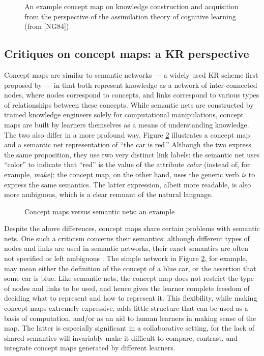 \begin{figure}
  \caption{An example concept map on knowledge construction and
  acquisition from the perspective of the assimilation theory of
  cognitive learning (from [NG84])}
  \label{fig:concept-map}
\end{figure}


\subsection{Critiques on concept maps: a KR perspective}
\label{sec:concept-map}

Concept maps are similar to semantic networks --- a widely used KR scheme
first proposed by \cite{Quilian67} --- in that both represent knowledge as a
network of inter-connected nodes, where nodes correspond to concepts, and
links correspond to various types of relationships between these concepts.
While semantic nets are constructed by trained knowledge engineers solely
for computational manipulations, concept maps are built by learners
themselves as a means of understanding knowledge. The two also differ in a
more profound way. Figure \ref{fig:kr-example} illustrates a concept map
and a semantic net representation of ``the car is red.''  Although the two
express the same proposition, they use two very distinct link labels: the
semantic net uses ``color'' to indicate that ``red'' is the value of the
attribute {\it color\/} (instead of, for example, {\it make\/}); the
concept map, on the other hand, uses the generic verb {\it is\/} to express
the same semantics.  The latter expression, albeit more readable, is also
more ambiguous, which is a clear remnant of the natural language.

\begin{figure}
  \caption{Concept maps versus semantic nets: an example}
  \label{fig:kr-example}
\end{figure}

Despite the above differences, concept maps share certain problems with
semantic nets. One such a criticism concerns their semantics: although
different types of nodes and links are used in semantic networks, their
exact semantics are often not specified or left ambiguous \cite{Woods85}.
The simple network in Figure \ref{fig:kr-example}, for example, may mean
either the definition of the concept of a blue car, or the assertion that
some car is blue. Like semantic nets, the concept map does not restrict the
type of nodes and links to be used, and hence gives the learner complete
freedom of deciding what to represent and how to represent it. This
flexibility, while making concept maps extremely expressive, adds little
structure that can be used as a basis of computation, and/or as an aid to
human learners in making sense of the map.  The latter is especially
significant in a collaborative setting, for the lack of shared semantics
will invariably make it difficult to compare, contrast, and integrate
concept maps generated by different learners.

